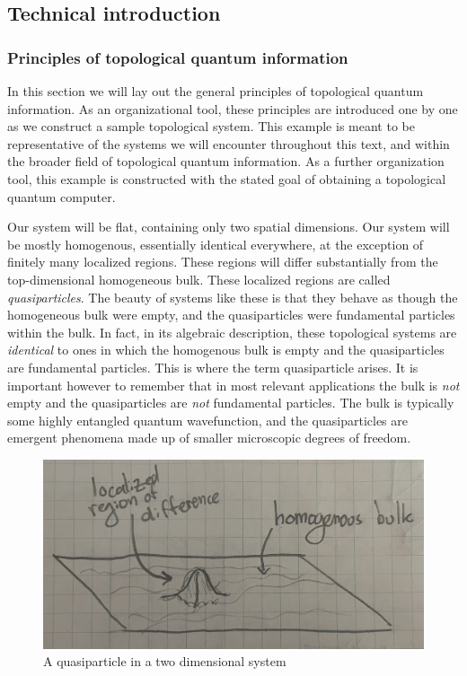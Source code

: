 \documentclass{article}
\theoremstyle{definition}
\newcommand{\0}{\left|0\right>}
\newcommand{\1}{\left|1\right>}
\numberwithin{figure}{section}
\begin{document}
\subsection{Technical introduction}
\label{technical introduction}

\subsubsection{Principles of topological quantum information}

In this section we will lay out the general principles of topological quantum information. As an organizational tool, these principles are introduced one by one as we construct a sample topological system. This example is meant to be representative of the systems we will encounter throughout this text, and within the broader field of topological quantum information. As a further organization tool, this example is constructed with the stated goal of obtaining a topological quantum computer.

Our system will be flat, containing only two spatial dimensions. Our system will be mostly homogenous, essentially identical everywhere, at the exception of finitely many localized regions. These regions will differ substantially from the top-dimensional homogeneous bulk. These localized regions are called \textit{quasiparticles}. The beauty of systems like these is that they behave as though the homogeneous bulk were empty, and the quasiparticles were fundamental particles within the bulk. In fact, in its algebraic description, these topological systems are \textit{identical} to ones in which the homogenous bulk is empty and the quasiparticles are fundamental particles. This is where the term quasiparticle arises. It is important however to remember that in most relevant applications the bulk is \textit{not} empty and the quasiparticles are \textit{not} fundamental particles. The bulk is typically some highly entangled quantum wavefunction, and the quasiparticles are emergent phenomena made up of smaller microscopic degrees of freedom.

\begin{figure}[h]
\begin{center}
\includegraphics[scale=.04]{quasiparticle}
\end{center}
\caption{A quasiparticle in a two dimensional system}
\end{figure}
\end{document}
